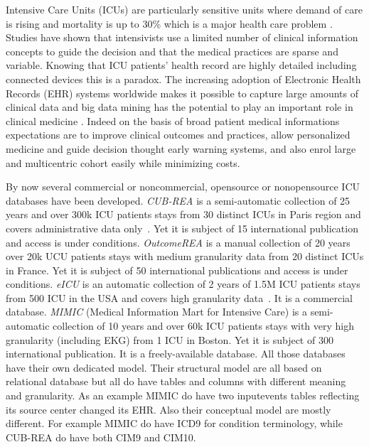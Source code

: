 Intensive Care Units (ICUs) are particularly sensitive units  where demand of
care is rising\cite{angus2000} and mortality is up to 30\% which is a major
health care problem \cite{icu-mortality}. Studies have shown that intensivists
use a limited number of clinical information concepts to guide the
decision\cite{icu-evidence} and that the medical practices are sparse and
variable. Knowing that ICU patients' health record are highly detailed
including connected devices this is a paradox.
The increasing adoption of Electronic Health Records (EHR) systems worldwide
makes it possible to capture large amounts of clinical data
\cite{bigdata-promise} and big data mining has the potential to play an
important role in clinical medicine \cite{bigdata-mining}. Indeed on the basis
of broad patient medical informations expectations are to improve clinical
outcomes and practices, allow personalized medicine and guide decision thought
early warning systems, and also enrol large and multicentric cohort easily
while minimizing costs.

By now several commercial or noncommercial, opensource or nonopensource ICU
databases have been developed.
\emph{CUB-REA} is a semi-automatic collection of 25 years and over 300k ICU
patients stays from 30 distinct ICUs in Paris region and covers administrative
data only \cite{cubrea-descr,cubrea-website}. Yet it is subject of 15
international publication and access is under conditions.
\emph{OutcomeREA} is a manual collection of 20 years over 20k UCU patients
stays with medium granularity data from 20 distinct ICUs in France. Yet it is
subject of 50 international publications and access is under conditions.
\emph{eICU} \cite{eicu-website} is an automatic collection of 2 years of 1.5M
ICU patients stays from 500 ICU in the USA and covers high granularity
data \cite{mimic-i2b2}. It is a commercial database.
\emph{MIMIC} (Medical Information Mart for Intensive Care) is a
semi-automatic collection of 10 years and over 60k ICU patients stays with very
high granularity (including EKG) from 1 ICU in Boston. Yet it is subject of 300
international publication. It is a freely-available database.
All those databases have their own dedicated model. Their structural model
are all based on relational database but all do have tables and columns with
different meaning and granularity. As an example MIMIC do have two inputevents
tables reflecting its source center changed its EHR. Also their conceptual
model are mostly different. For example MIMIC do have ICD9 for condition
terminology, while CUB-REA do have both CIM9 and CIM10. 

